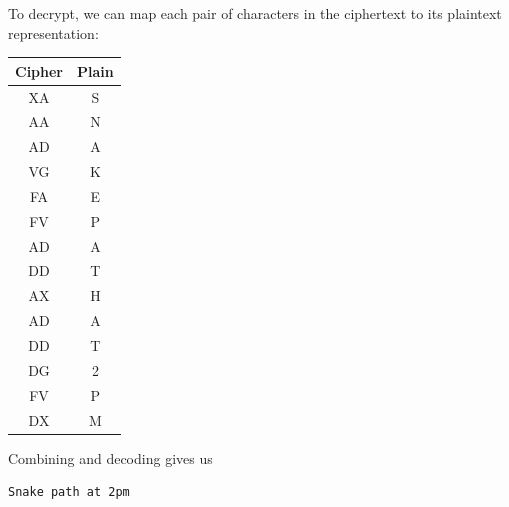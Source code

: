 \documentclass[letterpaper]{article}
\begin{document}
\begin{mdframed}
\begin{enumerate}[(a)]
        \begin{mdframed}
            To decrypt, we can map each pair of characters in the ciphertext to its plaintext representation:
            \begin{center}
                \begin{tabular}{c|c}
                    \textbf{Cipher} & \textbf{Plain} \\ 
                    \hline 
                    XA              & S \\
                    AA              & N \\
                    AD              & A \\
                    VG              & K \\
                    FA              & E \\
                    FV              & P \\
                    AD              & A \\
                    DD              & T \\
                    AX              & H \\
                    AD              & A \\
                    DD              & T \\
                    DG              & 2 \\
                    FV              & P \\
                    DX              & M 
                \end{tabular} 
            \end{center}
            Combining and decoding gives us 
            \begin{mdframed}
                \begin{verbatim}
Snake path at 2pm\end{verbatim}
            \end{mdframed}
        \end{mdframed}
    \end{enumerate}
\end{mdframed}
\end{document}
